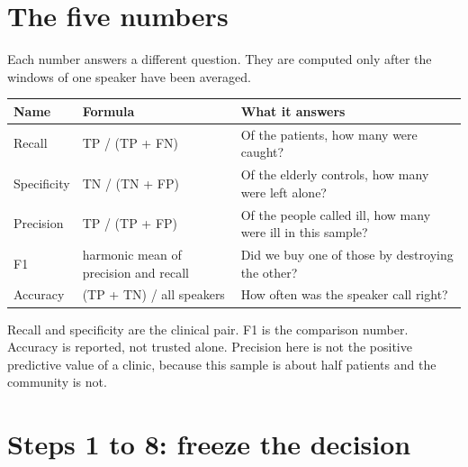 \documentclass[11pt]{article}
\begin{document}
\section{The five numbers}

Each number answers a different question. They are computed only after the windows of one speaker have been averaged.

\begin{center}
\begin{tabular}{llp{7.2cm}}
\toprule
Name & Formula & What it answers \\
\midrule
Recall & TP / (TP + FN) & Of the patients, how many were caught? \\
Specificity & TN / (TN + FP) & Of the elderly controls, how many were left alone? \\
Precision & TP / (TP + FP) & Of the people called ill, how many were ill in this sample? \\
F1 & harmonic mean of precision and recall & Did we buy one of those by destroying the other? \\
Accuracy & (TP + TN) / all speakers & How often was the speaker call right? \\
\bottomrule
\end{tabular}
\end{center}

Recall and specificity are the clinical pair. F1 is the comparison number. Accuracy is reported, not trusted alone. Precision here is not the positive predictive value of a clinic, because this sample is about half patients and the community is not.

\section{Steps 1 to 8: freeze the decision}
\end{document}
